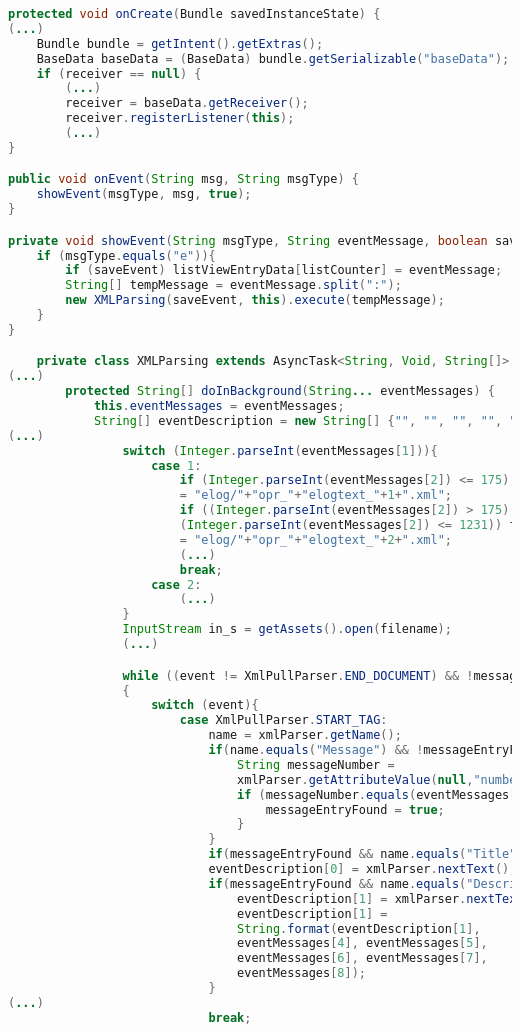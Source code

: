 \label{appCode:klasseEvents}
\begin{lstlisting}[language=java, caption=Klasse Events]
protected void onCreate(Bundle savedInstanceState) {
(...)
	Bundle bundle = getIntent().getExtras();
    BaseData baseData = (BaseData) bundle.getSerializable("baseData");
    if (receiver == null) {
	    (...)
        receiver = baseData.getReceiver();
        receiver.registerListener(this);
        (...)
}

public void onEvent(String msg, String msgType) {
	showEvent(msgType, msg, true);
}

private void showEvent(String msgType, String eventMessage, boolean saveEvent) {
	if (msgType.equals("e")){
	    if (saveEvent) listViewEntryData[listCounter] = eventMessage;
        String[] tempMessage = eventMessage.split(":");
        new XMLParsing(saveEvent, this).execute(tempMessage);
    }
}

    private class XMLParsing extends AsyncTask<String, Void, String[]> {
(...)
        protected String[] doInBackground(String... eventMessages) {
            this.eventMessages = eventMessages;
            String[] eventDescription = new String[] {"", "", "", "", "", ""};
(...)
                switch (Integer.parseInt(eventMessages[1])){
                    case 1:
                        if (Integer.parseInt(eventMessages[2]) <= 175) filename 
                        = "elog/"+"opr_"+"elogtext_"+1+".xml";
                        if ((Integer.parseInt(eventMessages[2]) > 175) && 
                        (Integer.parseInt(eventMessages[2]) <= 1231)) filename 
                        = "elog/"+"opr_"+"elogtext_"+2+".xml";
                        (...)
                        break;
                    case 2:
                        (...)
                }
                InputStream in_s = getAssets().open(filename);
                (...)

                while ((event != XmlPullParser.END_DOCUMENT) && !messageReadOk)
                {
                    switch (event){
                        case XmlPullParser.START_TAG:
                            name = xmlParser.getName();
                            if(name.equals("Message") && !messageEntryFound) {
                                String messageNumber = 
                                xmlParser.getAttributeValue(null,"number");
                                if (messageNumber.equals(eventMessages[2])){
                                    messageEntryFound = true;
                                }
                            }
                            if(messageEntryFound && name.equals("Title")) 
                            eventDescription[0] = xmlParser.nextText();
                            if(messageEntryFound && name.equals("Description")){
                                eventDescription[1] = xmlParser.nextText();
                                eventDescription[1] = 
                                String.format(eventDescription[1], 
                                eventMessages[4], eventMessages[5], 
                                eventMessages[6], eventMessages[7], 
                                eventMessages[8]);
                            }
(...)
                            break;


\end{lstlisting}
